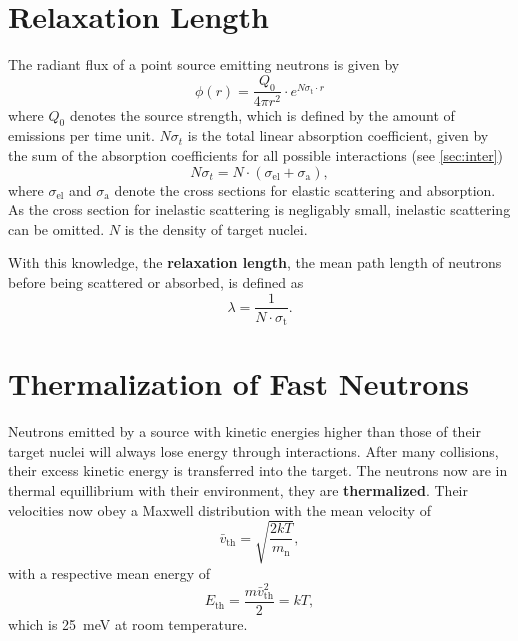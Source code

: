 \section{Relaxation Length}
The radiant flux of a point source emitting neutrons is given by
\begin{equation}\label{eq:relax}
	\phi(r) = \frac{Q_0}{4\pi r^2}\cdot e^{N\sigma_\text{t}\cdot r}
\end{equation}
where $Q_0$ denotes the source strength, which is defined by the amount of emissions per time unit.
$N\sigma_t$ is the total linear absorption coefficient, given by the sum of the absorption coefficients for all possible interactions (see \autoref{sec:inter})
\begin{equation*}
	N\sigma_t = N\cdot(\sigma_\text{el} + \sigma_\text{a}),
\end{equation*}
where $\sigma_\text{el}$ and $\sigma_\text{a}$ denote the cross sections for elastic scattering and absorption.
As the cross section for inelastic scattering is negligably small, inelastic scattering can be omitted.
$N$ is the density of target nuclei.

With this knowledge, the \textbf{relaxation length}, the mean path length of neutrons before being scattered or absorbed, is defined as
\begin{equation*}
	\lambda = \frac{1}{N\cdot\sigma_\text{t}}.
\end{equation*}

\section{Thermalization of Fast Neutrons}
Neutrons emitted by a source with kinetic energies higher than those of their target nuclei will always lose energy through interactions.
After many collisions, their excess kinetic energy is transferred into the target.
The neutrons now are in thermal equillibrium with their environment, they are \textbf{thermalized}.
Their velocities now obey a Maxwell distribution with the mean velocity of
\begin{equation*}
	\bar{v}_\text{th}=\sqrt{\frac{2kT}{m_\text{n}}},
\end{equation*}
with a respective mean energy of
\begin{equation*}
	E_\text{th}=\frac{m\bar{v}_\text{th}^2}{2} = kT,
\end{equation*}
which is \SI{25}{\meV} at room temperature.

